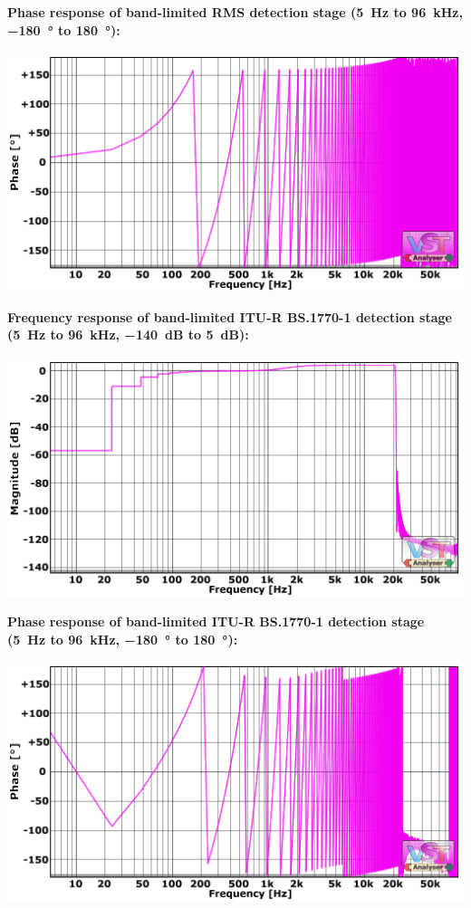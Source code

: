 \textbf{Phase response of band-limited RMS detection stage
  (\SI{5}{\hertz} to \SI{96}{\kilo\hertz}, \SI{-180}{\degree} to
  \SI[addsign]{+180}{\degree}):}

\begin{center}
  \includegraphics[scale=0.65,clip]{include/images/fft_192khz-phase-rms.png}
\end{center}
\newpage %

\textbf{Frequency response of band-limited ITU-R BS.1770-1 detection stage
  (\SI{5}{\hertz} to \SI{96}{\kilo\hertz}, \SI{-140}{\dB} to
  \SI{5}{\dB}):}

\begin{center}
  \includegraphics[scale=0.65,clip]{include/images/fft_192khz-freq-itu_r.png}
\end{center}

\textbf{Phase response of band-limited ITU-R BS.1770-1 detection stage
  (\SI{5}{\hertz} to \SI{96}{\kilo\hertz}, \SI{-180}{\degree} to
  \SI[addsign]{+180}{\degree}):}

\begin{center}
  \includegraphics[scale=0.65,clip]{include/images/fft_192khz-phase-itu_r.png}
\end{center}

